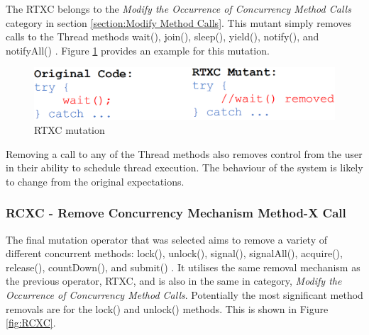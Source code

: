 \documentclass[a4paper,12pt]{article}
\begin{document}
The RTXC belongs to the \textit{Modify the Occurrence of Concurrency Method Calls} category in section \ref{section:Modify Method Calls}. This mutant simply removes calls to the Thread methods wait(), join(), sleep(), yield(), notify(), and notifyAll() \citep{bradbury06}. Figure \ref{fig:RTXC} provides an example for this mutation.

\begin{figure}[h]
    \centering
    \includegraphics[scale = 0.35]{RTXC.png}
    \caption{RTXC mutation \citep{bradbury06}}
    \label{fig:RTXC}
\end{figure}

Removing a call to any of the Thread methods also removes control from the user in their ability to schedule thread execution. The behaviour of the system is likely to change from the original expectations.

\subsubsection{RCXC - Remove Concurrency Mechanism Method-X Call}

The final mutation operator that was selected aims to remove a variety of different concurrent methods: lock(), unlock(), signal(), signalAll(), acquire(), release(), countDown(), and submit() \citep{bradbury06}. It utilises the same removal mechanism as the previous operator, RTXC, and is also in the same in category, \textit{Modify the Occurrence of Concurrency Method Calls}. Potentially the most significant method removals are for the lock() and unlock() methods. This is shown in Figure \ref{fig:RCXC}. 
\end{document}
